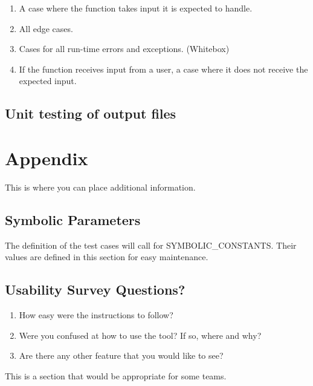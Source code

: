 \documentclass[12pt, titlepage]{article}
\begin{document}
\begin{enumerate}
\item A case where the function takes input it is expected to handle. 
\item All edge cases.
\item Cases for all run-time errors and exceptions. (Whitebox)
\item If the function receives input from a user, a case where it does not receive the expected input.
\end{enumerate}
	
\subsection{Unit testing of output files}		





\newpage

\section{Appendix}

This is where you can place additional information.

\subsection{Symbolic Parameters}

The definition of the test cases will call for SYMBOLIC\_CONSTANTS.
Their values are defined in this section for easy maintenance.

\subsection{Usability Survey Questions?}
\begin{enumerate}
\item How easy were the instructions to follow?

\item Were you confused at how to use the tool? If so, where and why?

\item Are there any other feature that you would like to see?

\end{enumerate}
This is a section that would be appropriate for some teams.
\end{document}

